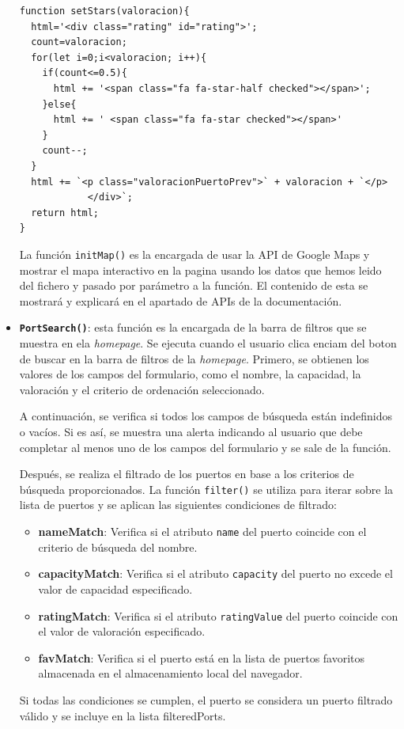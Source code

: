 \documentclass{article}
\begin{document}
\begin{itemize}
\begin{verbatim}
function setStars(valoracion){
  html='<div class="rating" id="rating">';
  count=valoracion;
  for(let i=0;i<valoracion; i++){
    if(count<=0.5){
      html += '<span class="fa fa-star-half checked"></span>';
    }else{
      html += ' <span class="fa fa-star checked"></span>'
    }
    count--;
  }
  html += `<p class="valoracionPuertoPrev">` + valoracion + `</p>
            </div>`;
  return html;
}
    \end{verbatim}
    La función \texttt{initMap()} es la encargada de usar la API de Google Maps y mostrar el mapa interactivo en la pagina usando los datos que hemos leido del fichero y pasado por parámetro a la función. El contenido de esta se mostrará y explicará en el apartado de APIs de la documentación.
    \item \texttt{\textbf{PortSearch()}}: esta función es la encargada de la barra de filtros que se muestra en ela \textit{homepage}. Se ejecuta cuando el usuario clica enciam del boton de buscar en la barra de filtros de la \textit{homepage}. Primero, se obtienen los valores de los campos del formulario, como el nombre, la capacidad, la valoración y el criterio de ordenación seleccionado.

    A continuación, se verifica si todos los campos de búsqueda están indefinidos o vacíos. Si es así, se muestra una alerta indicando al usuario que debe completar al menos uno de los campos del formulario y se sale de la función.
    
    Después, se realiza el filtrado de los puertos en base a los criterios de búsqueda proporcionados. La función \texttt{filter()} se utiliza para iterar sobre la lista de puertos y se aplican las siguientes condiciones de filtrado:
    \begin{itemize}
      \item \textbf{nameMatch}: Verifica si el atributo \texttt{name} del puerto coincide con el criterio de búsqueda del nombre.
      \item \textbf{capacityMatch}: Verifica si el atributo \texttt{capacity} del puerto no excede el valor de capacidad especificado.
      \item \textbf{ratingMatch}: Verifica si el atributo \texttt{ratingValue} del puerto coincide con el valor de valoración especificado.
      \item \textbf{favMatch}: Verifica si el puerto está en la lista de puertos favoritos almacenada en el almacenamiento local del navegador.
    \end{itemize}
    Si todas las condiciones se cumplen, el puerto se considera un puerto filtrado válido y se incluye en la lista filteredPorts.
    

\end{itemize}
\end{document}
